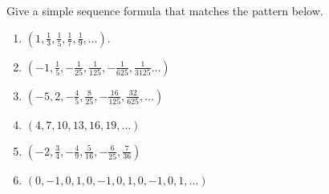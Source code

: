 Give a simple sequence formula that matches the pattern below. 

\begin{multicols}{2}
\begin{enumerate}
\item $\displaystyle \left(1, \frac{1}{3}, \frac{1}{5}, \frac{1}{7},\frac{1}{9},\dots \right)$.

\item $\displaystyle \left(-1, \frac{1}{5}, -\frac{1}{25}, \frac{1}{125},-\frac{1}{625}, \frac{1}{3125}\dots \right)$

\item $\displaystyle \left(-5, 2, -\frac{4}{5}, \frac{8}{25}, -\frac{16}{125}, \frac{32}{625},\dots \right)$


\item $\displaystyle \left(4, 7, 10, 13, 16, 19,\dots\right)$


\item $(-2, \frac{3}{4}, -\frac{4}{9}, \frac{5}{16}, -\frac{6}{25}, \frac{7}{36})$


\item $\left(0,-1, 0, 1,0,-1, 0, 1,0,-1, 0, 1,\dots \right)$

\end{enumerate}
\end{multicols}